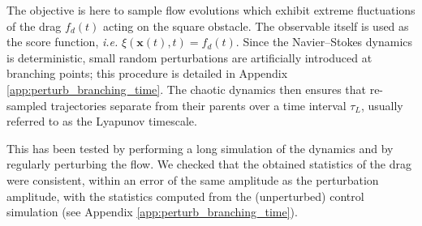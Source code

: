 \documentclass{jfm}
\newcommand{\EL}[1]{{\color{myred}{#1}}}
\newcommand{\QQ}[1]{{\color{green}{#1}}}
\begin{document}
{%



%
%
%
%


The objective is here to sample flow evolutions which exhibit extreme fluctuations of the drag $f_d(t)$ acting on the square obstacle.
The observable itself is used as the score function, \emph{i.e.} $\xi (\mathbf{x}(t),t) = f_d(t)$.  
%
Since the Navier--Stokes dynamics is deterministic, small random perturbations are artificially introduced at branching points; this procedure is detailed in Appendix \ref{app:perturb_branching_time}.
The chaotic dynamics then ensures that re-sampled trajectories separate from their parents over a time interval $\tau_L$, usually referred to as the Lyapunov timescale.}
\EL{Based on linear response theory, we expect this small perturbation to have a negligible impact on the statistics of the sampled rare events.} This has been tested by performing a long simulation of the dynamics and by regularly perturbing the flow. We checked that the obtained statistics of the drag were consistent, within an error of the same amplitude as the perturbation amplitude, with the statistics computed from the (unperturbed) control simulation (see Appendix \ref{app:perturb_branching_time}). %
\end{document}
